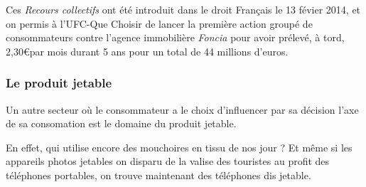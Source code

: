 \medbreak
Ces \textit{Recours collectifs} ont été introduit dans le droit Français le 13 févier 2014, et on permis à l'UFC-Que Choisir de lancer la première action groupé de consommateurs contre l'agence immobilière \textit{Foncia} pour avoir prélevé, à tord, 2,30\euro par mois durant 5 ans pour un total de 44 millions d'euros\cite{adg_Foncia}.

\subsubsection{Le produit jetable}

Un autre secteur où le consommateur a le choix d'influencer par sa décision l'axe de sa consomation est le domaine du produit jetable.

\smallbreak
En effet, qui utilise encore des mouchoires en tissu de nos jour ?
Et même si les appareils photos jetables on disparu de la valise des touristes au profit des téléphones portables, on trouve maintenant des téléphones dis jetable. %
